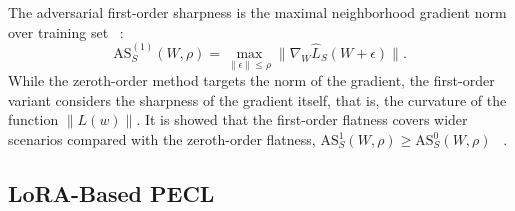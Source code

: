 \documentclass{article}
\theoremstyle{plain}
\theoremstyle{definition}
\theoremstyle{remark}
\begin{document}
The adversarial first-order sharpness is the maximal neighborhood gradient norm over training set ~\citep{Zhang_GAM}:
$$\mathrm{AS}^{(1)}_S(W,\rho) = \max_{ \| \epsilon \|\leq \rho } \| \nabla_{W} \hat{L}_S(W+\epsilon)\|.$$
While the zeroth-order method targets the norm of the gradient, the first-order variant considers the sharpness of the gradient itself, that is, the curvature of the function $\|L(w)\|$. It is showed that the first-order flatness covers wider scenarios compared with the zeroth-order flatness, $\mathrm{AS}^{1}_S(W,\rho) \geq \mathrm{AS}^{0}_S(W,\rho)$ ~\citep{Zhang_GAM}.

 









\subsection{LoRA-Based PECL}
\label{sec:pecl-setup}







\end{document}
